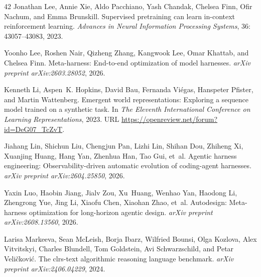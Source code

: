 \begin{thebibliography}{42}
Jonathan Lee, Annie Xie, Aldo Pacchiano, Yash Chandak, Chelsea Finn, Ofir Nachum, and Emma Brunskill.
\newblock Supervised pretraining can learn in-context reinforcement learning.
\newblock \emph{Advances in Neural Information Processing Systems}, 36: 43057--43083, 2023.

Yoonho Lee, Roshen Nair, Qizheng Zhang, Kangwook Lee, Omar Khattab, and Chelsea Finn.
\newblock Meta-harness: End-to-end optimization of model harnesses.
\newblock \emph{arXiv preprint arXiv:2603.28052}, 2026.

Kenneth Li, Aspen~K. Hopkins, David Bau, Fernanda Vi{\'e}gas, Hanspeter Pfister, and Martin Wattenberg.
\newblock Emergent world representations: Exploring a sequence model trained on a synthetic task.
\newblock In \emph{The Eleventh International Conference on Learning Representations}, 2023.
\newblock URL \url{https://openreview.net/forum?id=DeG07_TcZvT}.

Jiahang Lin, Shichun Liu, Chengjun Pan, Lizhi Lin, Shihan Dou, Zhiheng Xi, Xuanjing Huang, Hang Yan, Zhenhua Han, Tao Gui, et~al.
\newblock Agentic harness engineering: Observability-driven automatic evolution of coding-agent harnesses.
\newblock \emph{arXiv preprint arXiv:2604.25850}, 2026.

Yaxin Luo, Haobin Jiang, Jialv Zou, Xu~Huang, Wenhao Yan, Haodong Li, Zhengrong Yue, Jing Li, Xiaofu Chen, Xiaohan Zhao, et~al.
\newblock Autodesign: Meta-harness optimization for long-horizon agentic design.
\newblock \emph{arXiv preprint arXiv:2608.13560}, 2026.

Larisa Markeeva, Sean McLeish, Borja Ibarz, Wilfried Bounsi, Olga Kozlova, Alex Vitvitskyi, Charles Blundell, Tom Goldstein, Avi Schwarzschild, and Petar Veli{\v{c}}kovi{\'c}.
\newblock The clrs-text algorithmic reasoning language benchmark.
\newblock \emph{arXiv preprint arXiv:2406.04229}, 2024.


\end{thebibliography}
